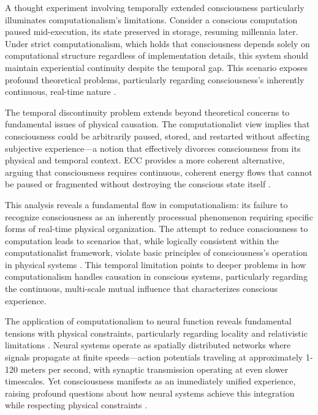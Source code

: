 \begin{refsection}
A thought experiment involving temporally extended consciousness particularly illuminates computationalism's limitations. Consider a conscious computation paused mid-execution, its state preserved in storage, resuming millennia later. Under strict computationalism, which holds that consciousness depends solely on computational structure regardless of implementation details, this system should maintain experiential continuity despite the temporal gap. This scenario exposes profound theoretical problems, particularly regarding consciousness's inherently continuous, real-time nature \cite{fodor2000mind}.

The temporal discontinuity problem extends beyond theoretical concerns to fundamental issues of physical causation. The computationalist view implies that consciousness could be arbitrarily paused, stored, and restarted without affecting subjective experience—a notion that effectively divorces consciousness from its physical and temporal context. ECC provides a more coherent alternative, arguing that consciousness requires continuous, coherent energy flows that cannot be paused or fragmented without destroying the conscious state itself \cite{bickhard1995foundational}.

This analysis reveals a fundamental flaw in computationalism: its failure to recognize consciousness as an inherently processual phenomenon requiring specific forms of real-time physical organization. The attempt to reduce consciousness to computation leads to scenarios that, while logically consistent within the computationalist framework, violate basic principles of consciousness's operation in physical systems \cite{searle1980minds}. This temporal limitation points to deeper problems in how computationalism handles causation in conscious systems, particularly regarding the continuous, multi-scale mutual influence that characterizes conscious experience.

The application of computationalism to neural function reveals fundamental tensions with physical constraints, particularly regarding locality and relativistic limitations \cite{van1998dynamical}. Neural systems operate as spatially distributed networks where signals propagate at finite speeds—action potentials traveling at approximately 1-120 meters per second, with synaptic transmission operating at even slower timescales. Yet consciousness manifests as an immediately unified experience, raising profound questions about how neural systems achieve this integration while respecting physical constraints \cite{wheeler2005reconstructing}.


\end{refsection}
